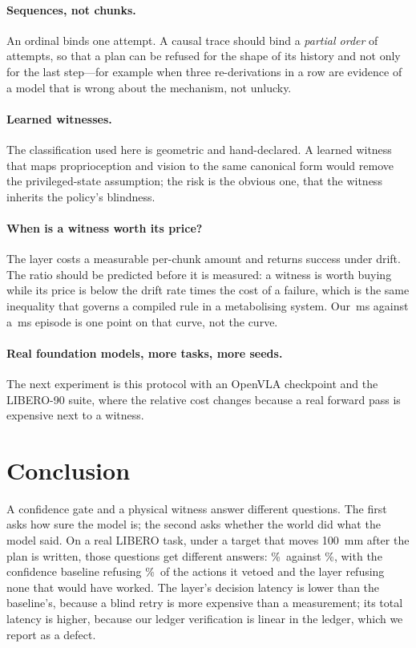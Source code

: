 \documentclass[conference]{IEEEtran}
\theoremstyle{definition}
\begin{document}
\paragraph{Sequences, not chunks.} An ordinal binds one attempt. A causal trace
should bind a \emph{partial order} of attempts, so that a plan can be refused
for the shape of its history and not only for the last step---for example when
three re-derivations in a row are evidence of a model that is wrong about the
mechanism, not unlucky.

\paragraph{Learned witnesses.} The classification used here is geometric and
hand-declared. A learned witness that maps proprioception and vision to the same
canonical form would remove the privileged-state assumption; the risk is the
obvious one, that the witness inherits the policy's blindness.

\paragraph{When is a witness worth its price?} The layer costs a measurable
per-chunk amount and returns success under drift. The ratio should be predicted
before it is measured: a witness is worth buying while its price is below the
drift rate times the cost of a failure, which is the same inequality that
governs a compiled rule in a metabolising system. Our \CELWitnessPerChunk\,ms
against a \SafeLatency\,ms episode is one point on that curve, not the curve.

\paragraph{Real foundation models, more tasks, more seeds.} The next experiment
is this protocol with an OpenVLA checkpoint and the LIBERO-90 suite, where the
relative cost changes because a real forward pass is expensive next to a witness.

\section{Conclusion}

A confidence gate and a physical witness answer different questions. The first
asks how sure the model is; the second asks whether the world did what the model
said. On a real LIBERO task, under a target that moves \SI{100}{mm} after the
plan is written, those questions get different answers: \SafePoseDrift\%\
against \CELPoseDrift\%, with the confidence baseline refusing
\SafeFalseVetoRate\%\ of the actions it vetoed and the layer refusing none that
would have worked. The layer's decision latency is lower than the baseline's,
because a blind retry is more expensive than a measurement; its total latency is
higher, because our ledger verification is linear in the ledger, which we report
as a defect.
\end{document}
